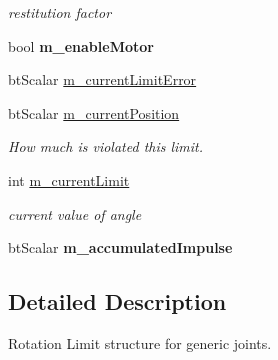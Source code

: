 \begin{DoxyCompactItemize}
\begin{DoxyCompactList}\small\item\em restitution factor \end{DoxyCompactList}\item 
\hypertarget{classbt_rotational_limit_motor_a8a515092c2d9f564d6bfe2774a56a394}{bool {\bfseries m\+\_\+enable\+Motor}}\label{classbt_rotational_limit_motor_a8a515092c2d9f564d6bfe2774a56a394}

\end{DoxyCompactItemize}

{\bf }\par
\begin{DoxyCompactItemize}
\item 
bt\+Scalar \hyperlink{classbt_rotational_limit_motor_a7128feccb391176842f287b584e375d3}{m\+\_\+current\+Limit\+Error}
\item 
\hypertarget{classbt_rotational_limit_motor_a1f334e324d5e337257c2b338e8e948de}{bt\+Scalar \hyperlink{classbt_rotational_limit_motor_a1f334e324d5e337257c2b338e8e948de}{m\+\_\+current\+Position}}\label{classbt_rotational_limit_motor_a1f334e324d5e337257c2b338e8e948de}

\begin{DoxyCompactList}\small\item\em How much is violated this limit. \end{DoxyCompactList}\item 
int \hyperlink{classbt_rotational_limit_motor_ad1e4fa6cb3ea2e4b78c96feab97448e8}{m\+\_\+current\+Limit}
\begin{DoxyCompactList}\small\item\em current value of angle \end{DoxyCompactList}\item 
\hypertarget{classbt_rotational_limit_motor_ac039866aac865fee30f5db25c0330c2f}{bt\+Scalar {\bfseries m\+\_\+accumulated\+Impulse}}\label{classbt_rotational_limit_motor_ac039866aac865fee30f5db25c0330c2f}

\end{DoxyCompactItemize}



\subsection{Detailed Description}
Rotation Limit structure for generic joints. 

